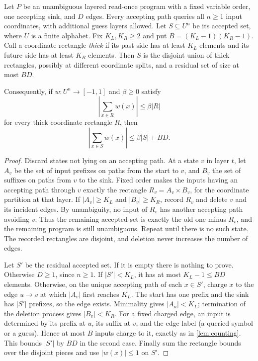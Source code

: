 \documentclass[11pt]{article}
\theoremstyle{plain}
\theoremstyle{definition}
\theoremstyle{remark}
\begin{document}
\begin{lemma}
\label{lem:weighted-frontier}
Let $P$ be an unambiguous layered read-once program with a fixed variable order, one accepting
sink, and $D$ edges. Every accepting path queries all $n\ge1$ input coordinates, with
additional guess layers allowed. Let $S\subseteq U^n$ be its accepted set, where $U$ is a
finite alphabet. Fix $K_L,K_R\ge2$ and put $B=(K_L-1)(K_R-1)$. Call a coordinate rectangle
\emph{thick} if its past side has at least $K_L$ elements and its future side has at least
$K_R$ elements. Then $S$ is the disjoint union of thick rectangles, possibly at different
coordinate splits, and a residual set of size at most $BD$.

Consequently, if $w:U^n\to[-1,1]$ and $\beta\ge0$ satisfy
\[
  \left|\sum_{x\in R}w(x)\right|\le\beta|R|
\]
for every thick coordinate rectangle $R$, then
\[
  \left|\sum_{x\in S}w(x)\right|
  \le \beta|S|+BD.
\]
\end{lemma}

\begin{proof}
Discard states not lying on an accepting path. At a state $v$ in layer $t$, let $A_v$ be the
set of input prefixes on paths from the start to $v$, and $B_v$ the set of suffixes on paths
from $v$ to the sink. Fixed order makes the inputs having an accepting path through $v$
exactly the rectangle $R_v=A_v\times B_v$, for the coordinate partition at that layer.
If $|A_v|\ge K_L$ and $|B_v|\ge K_R$, record $R_v$ and delete $v$ and its incident edges.
By unambiguity, no input of $R_v$ has another accepting path avoiding $v$. Thus the remaining
accepted set is exactly the old one minus $R_v$, and the remaining program is still
unambiguous. Repeat until there is no such state. The recorded rectangles are disjoint,
and deletion never increases the number of edges.

Let $S'$ be the residual accepted set. If it is empty there is nothing to prove.
Otherwise $D\ge1$, since $n\ge1$.
If $|S'|<K_L$, it has at most $K_L-1\le BD$ elements. Otherwise,
on the unique accepting path of each $x\in S'$, charge $x$ to the edge $u\to v$ at which
$|A_v|$ first reaches $K_L$. The start has one prefix and the sink has $|S'|$ prefixes, so the
edge exists. Minimality gives $|A_u|<K_L$; termination of the deletion process gives $|B_v|<K_R$.
For a fixed charged edge, an input is determined by its prefix at $u$, its suffix at $v$,
and the edge label (a queried symbol or a guess). Hence at most $B$ inputs charge to it,
exactly as in \cref{lem:counting}. This bounds $|S'|$ by $BD$ in the second case.
Finally sum the rectangle bounds over the disjoint pieces and use $|w(x)|\le1$ on $S'$.
\end{proof}
\end{document}
